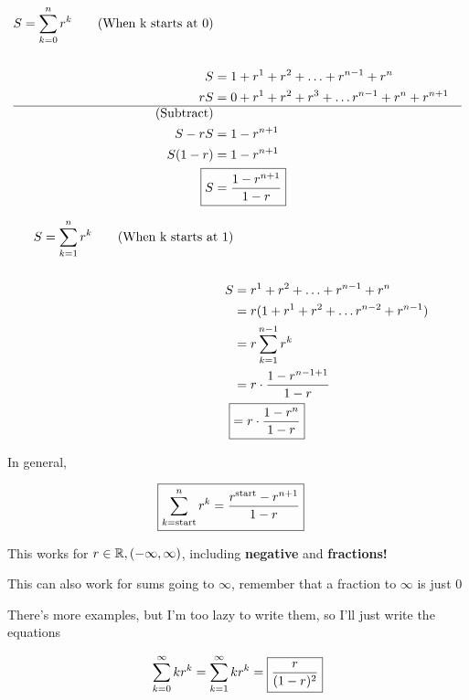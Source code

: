 \documentclass[../../Main.tex]{subfiles}
\begin{document}
\begin{example}
\begin{enumerate}
\begin{note}
            \begin{align*}
                S = \sum_{k = 0}^{n} r^k \tag{When k starts at 0} \\
                \\
                S &= 1 + r^1 + r^2 + \ldots + r^{n - 1} + r^n \\
                rS &= 0 + r^1 + r^2 + r^3 + \ldots r^{n - 1} + r^n + r^{n + 1} \\
                \hline \tag{Subtract} \\
                S - rS &= 1 - r^{n + 1} \\
                S(1 - r) &= 1 - r^{n + 1} \\
                \Aboxed{S &= \frac{1 - r^{n + 1}}{1 - r}} \\
            \end{align*}

            \begin{align*}
                S = \sum_{k = 1}^{n} r^k \tag{When k starts at 1} \\
                \\
                S &= r^1 + r^2 + \ldots + r^{n - 1} + r^n \\
                &= r(1 + r^1 + r^2 + \ldots r^{n - 2} + r^{n - 1}) \\
                &= r \sum_{k = 1}^{n - 1}r^k \\
                &= r \cdot \frac{1 - r^{n - 1 + 1}}{1 - r} \\ 
                \Aboxed{&= r \cdot \frac{1 - r^n}{1 - r}} \\
            \end{align*}

            In general,

            \begin{align*}
                \Aboxed{\sum_{k = \text{start}}^{n} r^k = \frac{r^{\text{start}} - r^{n + 1}}{1 - r}}
            \end{align*}
            
            \begin{note}
                This works for $r \in \mathbb{R}, (-\infty, \infty)$, including \textbf{negative} and \textbf{fractions!}

                This can also work for sums going to $\infty$, remember that a fraction to $\infty$ is just $0$
            \end{note}
        \end{note}

        There's more examples, but I'm too lazy to write them, so I'll just write the equations

        \begin{note}
            \begin{align*}
                \sum_{k = 0}^{\infty} kr^k = \sum_{k = 1}^{\infty} kr^k = \; \Aboxed{\frac{r}{(1 - r)^2}} \\
            \end{align*}
        \end{note}

    \end{enumerate}
\end{example}

\end{document}
